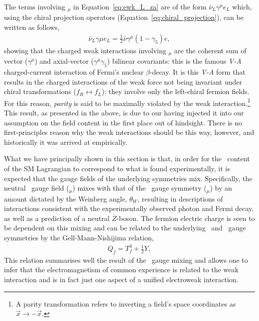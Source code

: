 The terms involving \fieldWpm$_{\mu}$ in Equation~\ref{eq:ewk_L_za} are
of the form $\bar{\nu}_L \gamma^{\mu} e_L$
which, using the chiral projection operators (Equation~\ref{eq:chiral_projection}), can be
written as follows,
\begin{align}
	\bar{\nu}_L \gamma{\mu} e_L = \frac{1}{2} \bar{\nu} \gamma^{\mu}(1-\gamma_5) e,
	\label{eq:v_minus_a}
\end{align}
showing that the charged weak interactions involving \fieldWpm$_{\mu}$ are the coherent
sum of vector ($\gamma^{\mu}$) and axial-vector ($\gamma^{\mu}\gamma_5$) bilinear covariants: this is the famous
\textit{V-A} charged-current interaction of Fermi's nuclear $\beta$-decay.
It is this \textit{V-A} form that results in the charged interactions of the weak force
not being invariant under chiral transformations ($f_R \leftrightarrow f_L$): they involve only
the left-chiral fermion fields. For this reason, \textit{parity}
is said to be maximally violated by the weak interaction.\footnote{A parity transformation
	refers to inverting a field's space coordinates as $\vec{x} \rightarrow -\vec{x}$.}
This result, as presented in the above, is due to our having injected
it into our assumption on the field content in the first place out of hindsight. There
is no first-principles reason why the weak interactions should be this way, however,
and historically it was arrived at empirically.

What we have principally shown in this section is that, in order for the \SUewk~content of
the SM Lagrangian to correspond to what is found experimentally, it is expected that
the gauge fields of the underlying symmetries mix. Specifically, the neutral \SUtwo~gauge field
(\fieldWzero$_{\mu}$) mixes with that of the \Uone~gauge symmetry (\fieldB$_{\mu}$) by an amount
dictated by the Weinberg angle, $\theta_W$, resulting in descriptions of interactions consistent
with the experimentally observed photon and Fermi decay, as well as a prediction of a neutral $Z$-boson. 
The fermion electric charge is seen to be dependent on this mixing
and can be related to the underlying \SUtwo~and \Uone~gauge symmetries by the
Gell-Mann-Nishijima relation,
\begin{align}
	Q_f = T_f^3 + \frac{1}{2}Y,
	\label{eq:gell_mann_nishijima}
\end{align}
This relation summarises well the result of the \SUewk~gauge mixing and allows one to
infer that the electromagnetism of common experience
is related to the weak interaction and is in fact just one aspect of a unified electroweak interaction.

